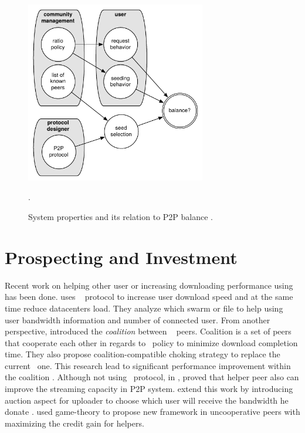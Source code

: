 \begin{figure}[ht]
	\centering
	\includegraphics[width=0.7\textwidth]{pics/p2psys_balance.pdf}
	\caption{System properties and its relation to P2P balance \cite{2011:managesupplydemand:meulpolder}.}.
	\label{fig:sysbalance}
\end{figure}


\section{Prospecting and Investment}

Recent work on helping other user or increasing downloading performance using \bt~ has been done. \citeauthor{2014:cloudseed:leon} uses \bt~ protocol to increase user download speed and at the same time reduce datacenters load. They analyze which swarm or file to help using user bandwidth information and number of connected user\cite{2014:cloudseed:leon}. From another perspective, \citeauthor{2015:coalitionbt:zhang} introduced the \textit{coalition} between \bt~ peers. Coalition is a set of peers that cooperate each other in regards to \bt~policy to minimize download completion time. They also propose coalition-compatible choking strategy to replace the current \bt~one. This research lead to significant performance improvement within the coalition \cite{2015:coalitionbt:zhang}. Although not using \bt~protocol, in \citeyear{2009:p2phelp:he}, \citeauthor{2009:p2phelp:he} proved that helper peer also can improve the streaming capacity in P2P system\cite{2009:p2phelp:he}. \citeauthor{2016:gameauctionp2pstream:mostafavi} extend this work by introducing auction aspect for uploader to choose which user will receive the bandwidth he donate \cite{2016:gameauctionp2pstream:mostafavi}. \citeauthor{2016:gameauctionp2pstream:mostafavi} used game-theory to propose new framework in uncooperative peers with maximizing the credit gain for helpers.

